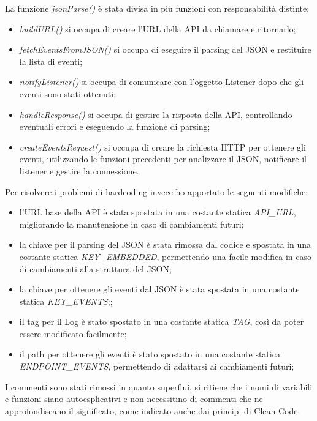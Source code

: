     La funzione \textit{jsonParse()} è stata divisa in più funzioni con responsabilità distinte:
    \begin{itemize}
        \item \textit{buildURL()} si occupa di creare l'URL della API da chiamare e ritornarlo;
        \item \textit{fetchEventsFromJSON()} si occupa di eseguire il parsing del JSON e restituire la lista di eventi;
        \item \textit{notifyListener()} si occupa di comunicare con l'oggetto Listener dopo che gli eventi sono stati ottenuti;
        \item \textit{handleResponse()} si occupa di gestire la risposta della API, controllando eventuali errori e eseguendo la funzione di parsing;
        \item \textit{createEventsRequest()} si occupa di creare la richiesta HTTP per ottenere gli eventi, utilizzando le funzioni precedenti per analizzare il JSON, notificare il listener e gestire la connessione.
    \end{itemize}

    Per risolvere i problemi di hardcoding invece ho apportato le seguenti modifiche:
    \begin{itemize}
        \item l'URL base della API è stata spostata in una costante statica \textit{API\_URL}, migliorando la manutenzione in caso di cambiamenti futuri;
        \item la chiave per il parsing del JSON è stata rimossa dal codice e spostata in una costante statica \textit{KEY\_EMBEDDED}, permettendo una facile modifica in caso di cambiamenti alla struttura del JSON;
        \item la chiave per ottenere gli eventi dal JSON è stata spostata in una costante statica \textit{KEY\_EVENTS};;  
        \item il tag per il Log è stato spostato in una costante statica \textit{TAG}, così da poter essere modificato facilmente;    
        \item il path per ottenere gli eventi è stato spostato in una costante statica \textit{ENDPOINT\_EVENTS}, permettendo di adattarsi ai cambiamenti futuri;  
    \end{itemize}

    I commenti sono stati rimossi in quanto superflui, si ritiene che i nomi di variabili e funzioni siano autoesplicativi e non necessitino di commenti che
    ne approfondiscano il significato, come indicato anche dai principi di Clean Code.
            
       
